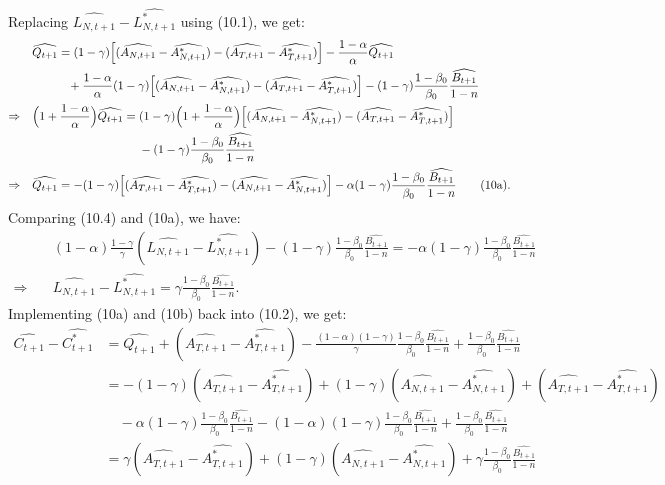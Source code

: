 \documentclass[a4paper,12pt]{article} %
\theoremstyle{nonitalic}
\begin{document}
Replacing $\widehat{L_{N,t+1}} - \widehat{L_{N,t+1}^*}$ using (10.1), we get:
\begin{align*}
    & \quad \widehat{Q_{t+1}} = (1-\gamma) \Bigl[ (\widehat{A_{N,t+1}} - \widehat{A_{N,t+1}^*}) - (\widehat{A_{T,t+1}} - \widehat{A_{T,t+1}^*}) \Bigr] - \frac{1-\alpha}{\alpha} \widehat{Q_{t+1}} \\
    &\quad\quad\quad\quad+ \frac{1-\alpha}{\alpha} (1-\gamma) \Bigl[ (\widehat{A_{N,t+1}} - \widehat{A_{N,t+1}^*}) - (\widehat{A_{T,t+1}} - \widehat{A_{T,t+1}^*}) \Bigr] - (1-\gamma) \frac{1-\beta_0}{\beta_0} \frac{\widehat{B_{t+1}}}{1-n} \\
    \Rightarrow & \quad \Bigl( 1 + \frac{1-\alpha}{\alpha} \Bigr) \widehat{Q_{t+1}} = (1-\gamma) \Bigl(1 + \frac{1-\alpha}{\alpha} \Bigr) \Bigl[ (\widehat{A_{N,t+1}} - \widehat{A_{N,t+1}^*}) - (\widehat{A_{T,t+1}} - \widehat{A_{T,t+1}^*}) \Bigr] \\
    &\quad\quad\quad\quad\quad\quad\quad\quad\quad\quad - (1-\gamma) \frac{1-\beta_0}{\beta_0} \frac{\widehat{B_{t+1}}}{1-n} \\
    \Rightarrow & \quad \widehat{Q_{t+1}} = -(1-\gamma) \Bigl[ (\widehat{A_{T,t+1}} - \widehat{A_{T,t+1}^*}) - (\widehat{A_{N,t+1}} - \widehat{A_{N,t+1}^*}) \Bigr] - \alpha (1-\gamma) \frac{1-\beta_0}{\beta_0} \frac{\widehat{B_{t+1}}}{1-n} \tag{10a}.
\end{align*}
Comparing (10.4) and (10a), we have:
\begin{align*}
    & \quad (1-\alpha) \frac{1-\gamma}{\gamma} (\widehat{L_{N,t+1}} - \widehat{L_{N,t+1}^*}) - (1-\gamma) \frac{1-\beta_0}{\beta_0} \frac{\widehat{B_{t+1}}}{1-n} = -\alpha (1-\gamma) \frac{1-\beta_0}{\beta_0} \frac{\widehat{B_{t+1}}}{1-n} \\
    \Rightarrow & \quad \widehat{L_{N,t+1}} - \widehat{L_{N,t+1}^*} = \gamma \frac{1-\beta_0}{\beta_0} \frac{\widehat{B_{t+1}}}{1-n} \tag{10b}.
\end{align*}
Implementing (10a) and (10b) back into (10.2), we get: 
\begin{align*}
    \widehat{C_{t+1}} - \widehat{C_{t+1}^*} &= \widehat{Q_{t+1}} + (\widehat{A_{T,t+1}} - \widehat{A_{T,t+1}^*}) - \frac{(1-\alpha)(1-\gamma)}{\gamma} \frac{1-\beta_0}{\beta_0} \frac{\widehat{B_{t+1}}}{1-n} + \frac{1-\beta_0}{\beta_0} \frac{\widehat{B_{t+1}}}{1-n} \\
    &= -(1-\gamma) (\widehat{A_{T,t+1}} - \widehat{A_{T,t+1}^*}) + (1-\gamma) (\widehat{A_{N,t+1}} - \widehat{A_{N,t+1}^*}) + (\widehat{A_{T,t+1}} - \widehat{A_{T,t+1}^*}) \\
    & \quad - \alpha (1-\gamma) \frac{1-\beta_0}{\beta_0} \frac{\widehat{B_{t+1}}}{1-n} - (1-\alpha) (1-\gamma) \frac{1-\beta_0}{\beta_0} \frac{\widehat{B_{t+1}}}{1-n} + \frac{1-\beta_0}{\beta_0} \frac{\widehat{B_{t+1}}}{1-n} \\
    &= \gamma(\widehat{A_{T,t+1}} - \widehat{A_{T,t+1}^*}) + (1-\gamma) (\widehat{A_{N,t+1}} - \widehat{A_{N,t+1}^*}) + \gamma \frac{1-\beta_0}{\beta_0} \frac{\widehat{B_{t+1}}}{1-n} \tag{10c}
\end{align*}
\end{document}
